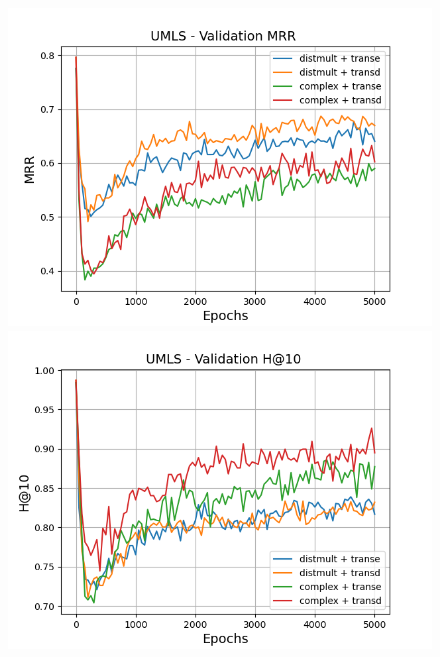 \begin{figure}
    \centering
    \begin{minipage}{.5\textwidth}
      \centering
      \includegraphics[width=\linewidth]{figures/results/gan_train/pretrained/random/umls/gan_train_random_umls_mrrs.png}
    \end{minipage}%
    \begin{minipage}{.5\textwidth}
      \centering
      \includegraphics[width=\linewidth]{figures/results/gan_train/pretrained/random/umls/gan_train_random_umls_hit10s.png}
    \end{minipage}
    

\end{figure}
